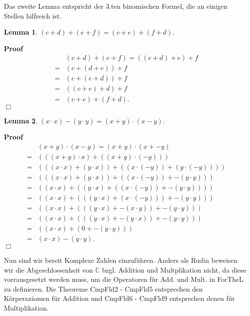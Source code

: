 \documentclass{article}
\newenvironment{forthel}{\begin{leftbar}}{\end{leftbar}}
\newenvironment{proof}{\noindent\textbf{Proof\ }}{\hspace*{\fill}$\Box$\medskip}
\newtheorem{lemma}{Lemma}
\newcommand{\CC}{\mathbb{C}}
\begin{document}
Das zweite Lemma entspricht der 3.ten binomischen Formel, die an einigen Stellen hilfreich ist.
\begin{forthel}

\begin{lemma} $(c + d) + (e  + f) = (c + e) + (f   + d)$.
\end{lemma}
\begin{proof}\begin{align*}
&(c + d) + (e  + f)	= ((c +  d) +  e)  + f \\
= &( c + (d  +  e)) + f \\
= &( c + (e  +  d)) + f \\
= &((c +  e) +  d)  + f \\
=  &(c +  e) + (f   + d).
\end{align*}
\end{proof}


\begin{lemma}
 $(x \cdot x) - (y \cdot y) = (x+y) \cdot (x-y)$.
\end{lemma}
\begin{proof}\begin{align*}
 &(x+y) \cdot (x-y) 	= (x+y) \cdot (x+ -y) \\
= &(((x+y) \cdot x)+ ((x+y) \cdot (-y)))\\
= &( ((x \cdot x) + (y \cdot x)) + ((x \cdot (-y)) + (y \cdot (-y))) )\\
= &( ((x \cdot x) + (y \cdot x)) + ((x \cdot (-y)) + -(y \cdot y)) )\\
= &( (x \cdot x) + ((y \cdot x) + ((x \cdot (-y)) + -(y \cdot y))) )\\
= &( (x \cdot x) + (((y \cdot x) + (x \cdot (-y))) + -(y \cdot y) ) )\\
= &( (x \cdot x) + (((y \cdot x) + -(x \cdot y)) + -(y \cdot y) ) )\\
= &( (x \cdot x) + (((y \cdot x) + -(y \cdot x)) + -(y \cdot y) ) )\\
= &( (x \cdot x) + (0 + -(y \cdot y) ) )\\
= &(x \cdot x) - (y \cdot y).
\end{align*}
\end{proof}






\end{forthel}
Nun sind wir bereit Komplexe Zahlen einzuführen. Anders als Rudin beweisen wir die Abgeschlossenheit von $\CC$ bzgl. Addition und Multplikation nicht, da diese vorrausgesetzt werden muss, um die Operatoren für Add. und Mult. in ForTheL zu definieren. Die Theoreme CmpFld2 - CmpFld5 entsprechen den Körperaxiomen für Addition und CmpFld6 - CmpFld9 entsprechen denen für Multiplikation. 
\end{document}
